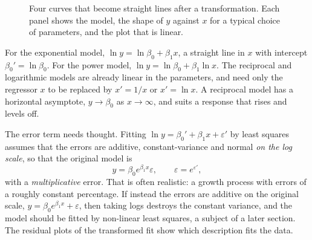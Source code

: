 \documentclass[11pt,a4paper]{article}
\numberwithin{equation}{section}
\theoremstyle{definition}
\begin{document}
\begin{figure}[H]
\centering
{}
\caption{Four curves that become straight lines after a transformation. Each panel shows the
model, the shape of $y$ against $x$ for a typical choice of parameters, and the plot that is
linear.}
\label{fig:linearizable}
\end{figure}

For the exponential model, $\ln y = \ln\beta_0 + \beta_1 x$, a straight line in $x$ with
intercept $\beta_0' = \ln\beta_0$. For the power model, $\ln y = \ln\beta_0 + \beta_1\ln x$.
The reciprocal and logarithmic models are already linear in the parameters, and need only the
regressor $x$ to be replaced by $x' = 1/x$ or $x' = \ln x$. A reciprocal model has a horizontal
asymptote, $y \to \beta_0$ as $x \to \infty$, and suits a response that rises and levels off.

The error term needs thought. Fitting $\ln y = \beta_0' + \beta_1 x + \varepsilon'$ by least squares
assumes that the errors are additive, constant-variance and normal \emph{on the log scale}, so
that the original model is
\[
y = \beta_0 e^{\beta_1 x}\varepsilon, \qquad \varepsilon = e^{\varepsilon'} ,
\]
with a \emph{multiplicative} error. That is often realistic: a growth process with errors of a
roughly constant percentage. If instead the errors are additive on the original scale,
$y = \beta_0 e^{\beta_1 x} + \varepsilon$, then taking logs destroys the constant variance, and the
model should be fitted by non-linear least squares, a subject of a later section. The residual
plots of the transformed fit show which description fits the data.
\end{document}
